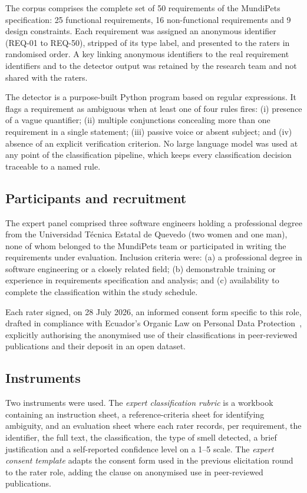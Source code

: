 \documentclass[pdflatex,sn-mathphys-num]{sn-jnl}
\theoremstyle{thmstyleone}%
\theoremstyle{thmstyletwo}%
\theoremstyle{thmstylethree}%
\begin{document}
The corpus comprises the complete set of 50 requirements of the MundiPets
specification: 25 functional requirements, 16 non-functional requirements and 9
design constraints. Each requirement was assigned an anonymous identifier
(REQ-01 to REQ-50), stripped of its type label, and presented to the raters in
randomised order. A key linking anonymous identifiers to the real requirement
identifiers and to the detector output was retained by the research team and not
shared with the raters.

The detector is a purpose-built Python program based on regular expressions. It
flags a requirement as ambiguous when at least one of four rules fires:
(i) presence of a vague quantifier; (ii) multiple conjunctions concealing more
than one requirement in a single statement; (iii) passive voice or absent
subject; and (iv) absence of an explicit verification criterion. No large
language model was used at any point of the classification pipeline, which keeps
every classification decision traceable to a named rule.

\subsection{Participants and recruitment}\label{subsec:participants}

The expert panel comprised three software engineers holding a professional
degree from the Universidad Técnica Estatal de Quevedo (two women and one man),
none of whom belonged to the MundiPets team or participated in writing the
requirements under evaluation. Inclusion criteria were: (a) a professional
degree in software engineering or a closely related field; (b) demonstrable
training or experience in requirements specification and analysis; and (c)
availability to complete the classification within the study schedule.

Each rater signed, on 28 July 2026, an informed consent form specific to this
role, drafted in compliance with Ecuador's Organic Law on Personal Data
Protection~\cite{lopdp2021}, explicitly authorising the anonymised use of their
classifications in peer-reviewed publications and their deposit in an open
dataset.

\subsection{Instruments}\label{subsec:instruments}

Two instruments were used. The \emph{expert classification rubric} is a workbook
containing an instruction sheet, a reference-criteria sheet for identifying
ambiguity, and an evaluation sheet where each rater records, per requirement,
the identifier, the full text, the classification, the type of smell detected, a
brief justification and a self-reported confidence level on a 1--5 scale. The
\emph{expert consent template} adapts the consent form used in the previous
elicitation round to the rater role, adding the clause on anonymised use in
peer-reviewed publications.
\end{document}
